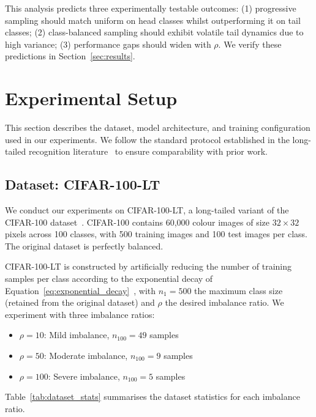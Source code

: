 \documentclass[12pt,a4paper]{article}
\begin{document}
This analysis predicts three experimentally testable outcomes: (1) progressive sampling should match uniform on head classes whilst outperforming it on tail classes; (2) class-balanced sampling should exhibit volatile tail dynamics due to high variance; (3) performance gaps should widen with $\rho$. We verify these predictions in Section~\ref{sec:results}.

\section{Experimental Setup}
\label{sec:experiments}

This section describes the dataset, model architecture, and training configuration used in our experiments. We follow the standard protocol established in the long-tailed recognition literature~\citep{cao2019learning, zhang2023deep} to ensure comparability with prior work.

\subsection{Dataset: CIFAR-100-LT}

We conduct our experiments on CIFAR-100-LT, a long-tailed variant of the CIFAR-100 dataset~\citep{krizhevsky2009learning}. CIFAR-100 contains 60,000 colour images of size $32 \times 32$ pixels across 100 classes, with 500 training images and 100 test images per class. The original dataset is perfectly balanced.

CIFAR-100-LT is constructed by artificially reducing the number of training samples per class according to the exponential decay of Equation~\eqref{eq:exponential_decay}~\citep{cao2019learning}, with $n_1 = 500$ the maximum class size (retained from the original dataset) and $\rho$ the desired imbalance ratio. We experiment with three imbalance ratios:
\begin{itemize}
    \item $\rho = 10$: Mild imbalance, $n_{100} = 49$ samples
    \item $\rho = 50$: Moderate imbalance, $n_{100} = 9$ samples
    \item $\rho = 100$: Severe imbalance, $n_{100} = 5$ samples
\end{itemize}

Table~\ref{tab:dataset_stats} summarises the dataset statistics for each imbalance ratio.
\end{document}
